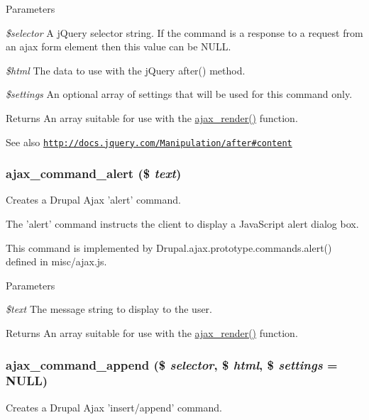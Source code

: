 \begin{DoxyParams}{Parameters}
\item[{\em \$selector}]A jQuery selector string. If the command is a response to a request from an ajax form element then this value can be NULL. \item[{\em \$html}]The data to use with the jQuery after() method. \item[{\em \$settings}]An optional array of settings that will be used for this command only.\end{DoxyParams}
\begin{DoxyReturn}{Returns}
An array suitable for use with the \hyperlink{group__ajax_ga241c2426bdde049c55b05b7bf5d714a2}{ajax\_\-render()} function.
\end{DoxyReturn}
\begin{DoxySeeAlso}{See also}
\href{http://docs.jquery.com/Manipulation/after#content}{\tt http://docs.jquery.com/Manipulation/after\#content} 
\end{DoxySeeAlso}
\hypertarget{group__ajax__commands_gae4fdd3ece45cf6469c7492f16219b337}{
\subsubsection[{ajax\_\-command\_\-alert}]{\setlength{\rightskip}{0pt plus 5cm}ajax\_\-command\_\-alert (\$ {\em text})}}
\label{group__ajax__commands_gae4fdd3ece45cf6469c7492f16219b337}
Creates a Drupal Ajax 'alert' command.

The 'alert' command instructs the client to display a JavaScript alert dialog box.

This command is implemented by Drupal.ajax.prototype.commands.alert() defined in misc/ajax.js.


\begin{DoxyParams}{Parameters}
\item[{\em \$text}]The message string to display to the user.\end{DoxyParams}
\begin{DoxyReturn}{Returns}
An array suitable for use with the \hyperlink{group__ajax_ga241c2426bdde049c55b05b7bf5d714a2}{ajax\_\-render()} function. 
\end{DoxyReturn}
\hypertarget{group__ajax__commands_ga861a6cb3b7347211edce388a2b446f91}{
\subsubsection[{ajax\_\-command\_\-append}]{\setlength{\rightskip}{0pt plus 5cm}ajax\_\-command\_\-append (\$ {\em selector}, \/  \$ {\em html}, \/  \$ {\em settings} = {\ttfamily NULL})}}
\label{group__ajax__commands_ga861a6cb3b7347211edce388a2b446f91}
Creates a Drupal Ajax 'insert/append' command.


